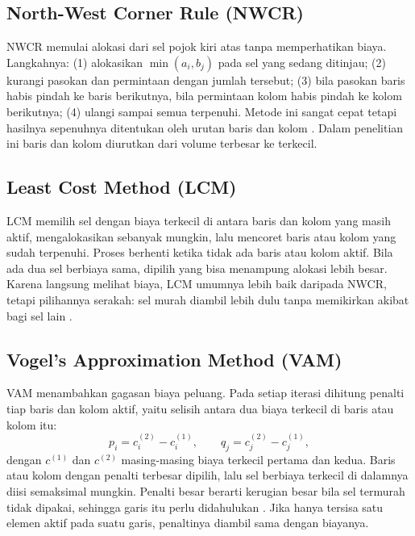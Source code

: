 \documentclass[a4paper,11pt]{article}
\begin{document}
\subsection{North-West Corner Rule (NWCR)}
NWCR memulai alokasi dari sel pojok kiri atas tanpa memperhatikan biaya. Langkahnya: (1) alokasikan $\min(a_i,b_j)$ pada sel yang sedang ditinjau; (2) kurangi pasokan dan permintaan dengan jumlah tersebut; (3) bila pasokan baris habis pindah ke baris berikutnya, bila permintaan kolom habis pindah ke kolom berikutnya; (4) ulangi sampai semua terpenuhi. Metode ini sangat cepat tetapi hasilnya sepenuhnya ditentukan oleh urutan baris dan kolom \cite{taha2017}. Dalam penelitian ini baris dan kolom diurutkan dari volume terbesar ke terkecil.

\subsection{Least Cost Method (LCM)}
LCM memilih sel dengan biaya terkecil di antara baris dan kolom yang masih aktif, mengalokasikan sebanyak mungkin, lalu mencoret baris atau kolom yang sudah terpenuhi. Proses berhenti ketika tidak ada baris atau kolom aktif. Bila ada dua sel berbiaya sama, dipilih yang bisa menampung alokasi lebih besar. Karena langsung melihat biaya, LCM umumnya lebih baik daripada NWCR, tetapi pilihannya serakah: sel murah diambil lebih dulu tanpa memikirkan akibat bagi sel lain \cite{hillier2021}.

\subsection{Vogel's Approximation Method (VAM)}
VAM menambahkan gagasan biaya peluang. Pada setiap iterasi dihitung penalti tiap baris dan kolom aktif, yaitu selisih antara dua biaya terkecil di baris atau kolom itu:
\begin{equation}
p_i=c_{i}^{(2)}-c_{i}^{(1)}, \qquad q_j=c_{j}^{(2)}-c_{j}^{(1)},
\label{eq:penalti}
\end{equation}
dengan $c^{(1)}$ dan $c^{(2)}$ masing-masing biaya terkecil pertama dan kedua. Baris atau kolom dengan penalti terbesar dipilih, lalu sel berbiaya terkecil di dalamnya diisi semaksimal mungkin. Penalti besar berarti kerugian besar bila sel termurah tidak dipakai, sehingga garis itu perlu didahulukan \cite{reinfeld1958}. Jika hanya tersisa satu elemen aktif pada suatu garis, penaltinya diambil sama dengan biayanya.
\end{document}
